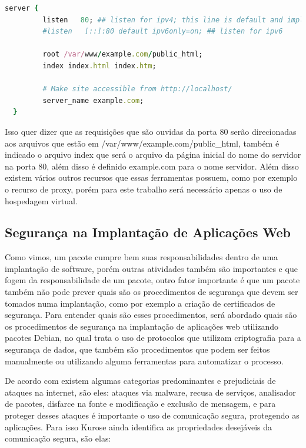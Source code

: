 \begin{lstlisting}[language=Ruby,label=dice_index,caption={Exemplo de arquivo de configuração de hospedagem virtual no Nginx}]
  server {
         listen   80; ## listen for ipv4; this line is default and implied
         #listen   [::]:80 default ipv6only=on; ## listen for ipv6

         root /var/www/example.com/public_html;
         index index.html index.htm;

         # Make site accessible from http://localhost/
         server_name example.com;
  }
\end{lstlisting}

Isso quer dizer que as requisições que são ouvidas da porta 80 serão direcionadas
aos arquivos que estão em /var/www/example.com/public\_html, também é indicado o
arquivo index que será o arquivo da página inicial do nome do servidor na porta 80,
além disso é definido example.com para o nome servidor. Além disso existem vários
outros recursos que essas ferramentas possuem, como por exemplo o recurso de proxy,
porém para este trabalho será necessário apenas o uso de hospedagem virtual.

\subsection{Segurança na Implantação de Aplicações Web}
\label{sec:seguranca}

Como vimos, um pacote cumpre bem suas responsabilidades dentro de uma implantação de
software, porém outras atividades também são importantes e que fogem da responsabilidade
de um pacote, outro fator importante é que um pacote também não pode prever quais são
os procedimentos de segurança que devem ser tomados numa implantação, como por exemplo a criação de certificados de
segurança. Para entender quais são esses procedimentos, será abordado quais são
os procedimentos de segurança na implantação de aplicações web utilizando
pacotes Debian, no qual trata o uso de protocolos que utilizam criptografia para a segurança de dados,
que também são procedimentos que podem ser feitos manualmente ou utilizando alguma
ferramentas para automatizar o processo.

De acordo com \cite{kurose2010redes} existem algumas categorias predominantes e prejudiciais
de ataques na internet, são eles: ataques via malware, recusa de serviços, analisador
de pacotes, disfarce na fonte e modificação e exclusão de mensagem, e para proteger
desses ataques é importante o uso de comunicação segura, protegendo as aplicações. Para
isso Kurose ainda identifica as propriedades desejáveis da comunicação segura, são elas:

